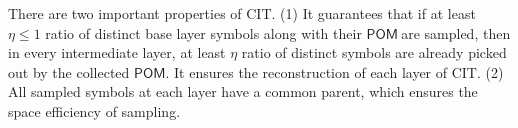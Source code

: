 \documentclass{article}
\newcommand{\POM}{$\mathsf{POM}\ $}
\newtheorem{lemma}{Lemma}[]
\begin{document}
There are two important properties of CIT. (1) It guarantees that if at least $\eta\le 1$ ratio of distinct base layer symbols along with their \POM are sampled, then in every intermediate layer, at least $\eta$ ratio of distinct symbols are already picked out by the collected $\mathsf{POM}$. It ensures the reconstruction of each layer of CIT. %
(2) All sampled symbols at each layer have a common parent, %
which ensures the space efficiency of sampling.








\end{document}
